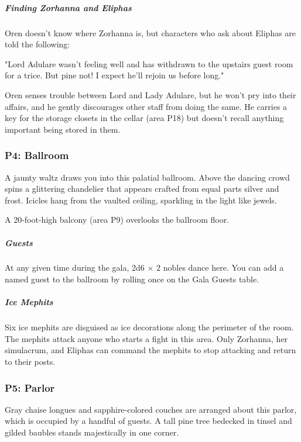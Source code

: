 \documentclass[10pt,a4paper,twoside,bg=print,twocolumn,openany,nodeprecatedcode]{dndbook}
\begin{document}
\subparagraph{Finding Zorhanna and Eliphas}
Oren doesn't know where Zorhanna is, but characters who ask about Eliphas are told the following:

\begin{DndReadAloud}{}
"Lord Adulare wasn't feeling well and has withdrawn to the upstairs guest room for a trice. But pine not! I expect he'll rejoin us before long."

\end{DndReadAloud}

Oren senses trouble between Lord and Lady Adulare, but he won't pry into their affairs, and he gently discourages other staff from doing the same. He carries a key for the storage closets in the cellar (area P18) but doesn't recall anything important being stored in them.

\subsubsection{P4: Ballroom}
\begin{DndReadAloud}{}
A jaunty waltz draws you into this palatial ballroom. Above the dancing crowd spins a glittering chandelier that appears crafted from equal parts silver and frost. Icicles hang from the vaulted ceiling, sparkling in the light like jewels.

\end{DndReadAloud}

A 20-foot-high balcony (area P9) overlooks the ballroom floor.

\subparagraph{Guests}
At any given time during the gala, 2d6 × 2 nobles dance here. You can add a named guest to the ballroom by rolling once on the Gala Guests table.

\subparagraph{Ice Mephits}
Six ice mephits are disguised as ice decorations along the perimeter of the room. The mephits attack anyone who starts a fight in this area. Only Zorhanna, her simulacrum, and Eliphas can command the mephits to stop attacking and return to their posts.

\subsubsection{P5: Parlor}
\begin{DndReadAloud}{}
Gray chaise longues and sapphire-colored couches are arranged about this parlor, which is occupied by a handful of guests. A tall pine tree bedecked in tinsel and gilded baubles stands majestically in one corner.

\end{DndReadAloud}
\end{document}
